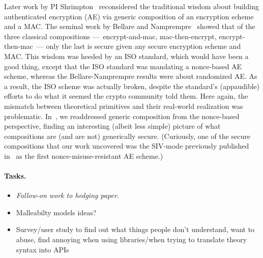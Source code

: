 Later work by PI Shrimpton~\cite{NRS} reconsidered the traditional wisdom about
building authenticated encryption (AE) via generic composition of an encryption
scheme and a MAC.   The seminal work by Bellare and Namprempre~\cite{BN} showed
that of the three classical compositions ---~encrypt-and-mac, mac-then-encrypt,
encrypt-then-mac~--- only the last is secure given any secure encryption scheme
and MAC.   This wisdom was heeded by an ISO standard, which would have been a
good thing, except that the ISO standard was mandating a nonce-based AE scheme,
whereas the Bellare-Namprempre results were about randomized AE.  As a result,
the ISO scheme was actually broken, despite the standard's (appaudible) efforts
to do what it seemed the crypto community told them.  Here again, the mismatch
between theoretical primitives and their real-world realization was problematic.
In~\cite{NRS}, we readdressed generic composition from the nonce-based
perspective, finding an interesting (albeit less simple) picture of what
compositions are (and are not) generically secure.  (Curiously, one of the
secure compositions that our work uncovered was the SIV-mode previously
published in~\cite{RS06} as the first nonce-misuse-resistant AE scheme.)


\paragraph{Tasks.}
\begin{itemize}
  \item \emph{Follow-on work to hedging paper.} 
\item {Malleabilty models ideas?}
\item {Survey/user study to find out what things people don't
    understand, want to abuse, find annoying when using libraries/when
  trying to translate theory syntax into APIs}
\end{itemize}
